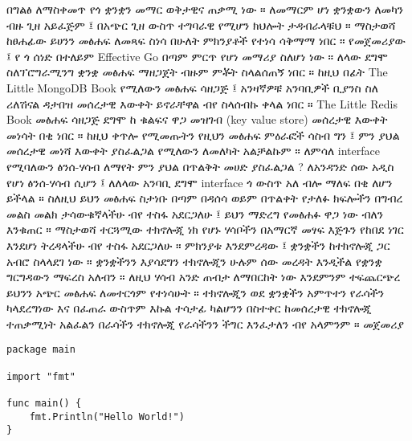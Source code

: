 \documentclass[12pt,a4paper]{report}
\begin{document}
\vskip 0.3in
\noindent
በግልፅ ለማስቀመጥ የጎ ቋንቋን መማር ወቅታዊና ጠቃሚ ነው ። ለመማርም ሆነ ቋንቋውን ለመካን ብዙ ጊዘ አይፈጅም ፤ በአጭር ጊዘ ውስጥ ተግባራዊ የሚሆን ክህሎት ታዳብራላቹህ ።
\vskip 0.3in
\noindent
\huge ማስታወሻ ከፀሐፊው
\normalsize
\vskip 0.3in
\noindent
ይሀንን መፅሐፍ ለመጻፍ ስነሳ በሁለት ምክንያቶች የተነሳ ሳቅማማ ነበር ። የመጀመሪያው ፤ የ ጎ ሰነድ በተለይም Effective Go በጣም ምርጥ የሆነ መማሪያ ስለሆነ ነው ።
\vskip 0.3in
\noindent
ለላው ደግሞ ስለፕሮግራሚንግ ቋንቋ መፅሐፍ ማዘጋጀት ብዙም ምቾት ስላልሰጠኝ ነበር ። ከዚህ በፊት The Little MongoDB Book የሚለውን መፅሐፍ ሳዘጋጅ ፤ አንዛኛዎቹ አንባቢዎች ቢያንስ ስለ ሪለሽናል ዳታበዝ መሰረታዊ እውቀት ይኖራቸዋል ብየ ስላሰብኩ ቀላል ነበር ።  The Little Redis Book መፅሐፍ ሳዘጋጅ ደግሞ ከ ቁልፍና ዋጋ መዝገብ (key value store) መሰረታዊ እውቀት መነሳት በቂ ነበር ።
\vskip 0.3in
\noindent
ከዚህ ቀጥሎ የሚመጡትን የዚህን መፅሐፍ ምዕራፎች ሳስብ ግን ፤ ምን ያህል መሰረታዊ መነሻ እውቀት ያስፈልጋል የሚለውን ለመለካት አልቻልኩም ። ለምሳለ interface የሚባለውን ፅንሰ-ሃሳብ ለማየት ምን ያህል በጥልቅት መሀድ ያስፈልጋል ? ለአንዳንድ ሰው አዲስ የሆነ ፅንሰ-ሃሳብ ሲሆን ፤ ለለላው አንባቢ ደግሞ interface ጎ ውስጥ አለ ብሎ ማለፍ በቂ ለሆን ይችላል ። ስለዚህ ይህን መፅሐፍ ስታነቡ በጣም በዳሰሳ ወይም በጥልቀት የታለፉ ክፍሎችን በግብረ መልስ መልክ ታሳውቁኛላችሁ ብየ ተስፋ አደርጋለሁ ፤ ይህን ማድረግ የመፅሐፉ ዋጋ ነው ብለን እንቁጠር ።
\vskip 0.3in
\noindent
\huge ማስታወሻ ተርጓሚው
\normalsize
\vskip 0.3in
\noindent
ተክኖሎጂ ነክ የሆኑ ሃሳቦችን በአማርኛ መፃፍ እጅጉን የከበደ ነገር እንደሆነ ትረዳላችሁ ብየ ተስፋ አደርጋለሁ ። ምክንያቱ እንደምረዳው ፤ ቋንቋችን ከተክኖሎጂ ጋር አብሮ ስላላደገ ነው ። ቋንቋችንን እያሳደግን ተክኖሎጂን ሁሉም ሰው መረዳት እንዲችል የቋንቋ ግርግዳውን ማፍረስ አለብን ። ለዚህ ሃሳብ አንድ ጠብታ ለማበርከት ነው እንደምንም ተፍጨርጭረ ይህንን አጭር መፅሐፍ ለመተርጎም የተነሳሁት ። ተክኖሎጂን ወደ ቋንቋችን አምጥተን የራሳችን ካላደረግነው እና በፈጠራ ውስጥም እኩል ተሳታፊ ካልሆንን በስተቀር ከመሰረታዊ ተክኖሎጂ ተጠቃሚነት አልፈልን በራሳችን ተክኖሎጂ የራሳችንን ችግር እንፈታለን ብየ አላምንም ። 
\vskip 0.3in
\noindent
\huge መጀመሪያ
\normalsize
\vskip 0.3in
\noindent


\begin{lstlisting}
package main

import "fmt"

func main() {
    fmt.Println("Hello World!")
}
\end{lstlisting}
\end{document}
